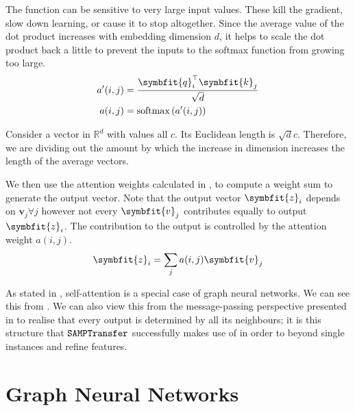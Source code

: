 The  function can be sensitive to very large input values. These kill the gradient, slow down learning, or cause it to stop altogether. Since the average value of the dot product increases with embedding dimension $d$, it helps to scale the dot product back a little to prevent the inputs to the softmax function from growing too large.
\begin{equation}
\label{eqn:qkv-attn-weight-calc}
\begin{split}
    a^\prime(i, j) &= \frac{\symbfit{q}_i^\top \symbfit{k}_j}{\sqrt{d}}\\
    a(i, j) &= \operatorname{softmax}\left( a^\prime(i, j) \right)\\
\end{split}
\end{equation}

\begin{tcolorbox}[title=Why $\sqrt{d}$?]
Consider a vector in $\mathbb{R}^d$ with values all $c$. Its Euclidean length is $\sqrt{d}c$. Therefore, we are dividing out the amount by which the increase in dimension increases the length of the average vectors.
\end{tcolorbox}

We then use the attention weights calculated in , to compute a weight sum to generate the output vector. Note that the output vector $\symbfit{z}_i$ depends on $\symbf{v}_j \forall j$ however not every $\symbfit{v}_j$ contributes equally to output $\symbfit{z}_i$. The contribution to the output is controlled by the attention weight $a(i, j)$.
\begin{equation}
    \label{eqn:qkv-attn-aggregation}
    \symbfit{z}_{i}=\sum_{j} a(i, j) \symbfit{v}_{j}
\end{equation}

As stated in , self-attention is a special case of graph neural networks. We can see this from . We can also view this from the message-passing perspective presented in  to realise that every output is determined by all its neighbours; it is this structure that $\texttt{SAMPTransfer}$ successfully makes use of in order to  beyond single instances and refine features.

\section{Graph Neural Networks}\label{sec:graph-nn}

